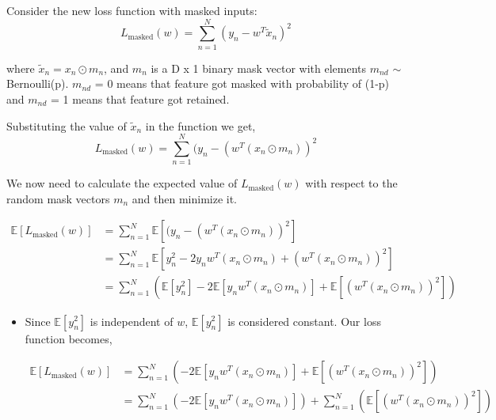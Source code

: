 \documentclass[a4paper,11pt]{article}
\begin{document}
\begin{mlsolution}

	
	Consider the new loss function with masked inputs:
	\[
	L_{\text{masked}}(w) = \sum_{n=1}^{N}(y_n - w^T \tilde{x}_n)^2
	\]
	
	where $\tilde{x}_n = x_n \odot m_n$, and $m_n$ is a D x 1 binary mask vector with elements $m_{nd}$ $\sim$ Bernoulli(p). $m_{nd}$ = 0 means that feature got masked with probability of (1-p) and $m_{nd}$ = 1 means that feature got retained.
	
	Substituting the value of $\tilde{x}_n$ in the function we get,
	\[
	L_{\text{masked}}(w) = \sum_{n=1}^{N}(y_n - (w^T ( x_n \odot m_n))^2
	\]
	
	We now need to calculate the expected value of $L_{\text{masked}}(w)$ with respect to the random mask vectors $m_n$ and then minimize it. 
	
	\begin{align*}
		\mathbb{E}[L_{\text{masked}}(w)] &= \sum_{n=1}^{N} \mathbb{E}\left[(y_n - (w^T (x_n \odot m_n))^2\right] \\
		&= \sum_{n=1}^{N} \mathbb{E}\left[y_n^2 - 2y_n w^T (x_n \odot m_n) + (w^T(x_n \odot m_n))^2\right] \\
		&= \sum_{n=1}^{N} \left(\mathbb{E}[y_n^2] - 2\mathbb{E}[y_n w^T (x_n \odot m_n)] + \mathbb{E}[(w^T (x_n \odot m_n))^2]\right)
	\end{align*}
	
	\begin{itemize}
		\item Since $\mathbb{E}[y_n^2]$ is independent of $w$, $\mathbb{E}[y_n^2]$ is considered constant.
		Our loss function becomes,
		
	\begin{align*}
		\mathbb{E}[L_{\text{masked}}(w)] &= \sum_{n=1}^{N} \left(- 2\mathbb{E}[y_n w^T (x_n \odot m_n)] + \mathbb{E}[(w^T (x_n \odot m_n))^2]\right) \\
		&= \sum_{n=1}^{N} \left(- 2\mathbb{E}[y_n w^T (x_n \odot m_n)]\right) + \sum_{n=1}^{N} \left(\mathbb{E}[(w^T (x_n \odot m_n))^2]\right) \\
	\end{align*}
		

\end{itemize}
\end{mlsolution}
\end{document}
